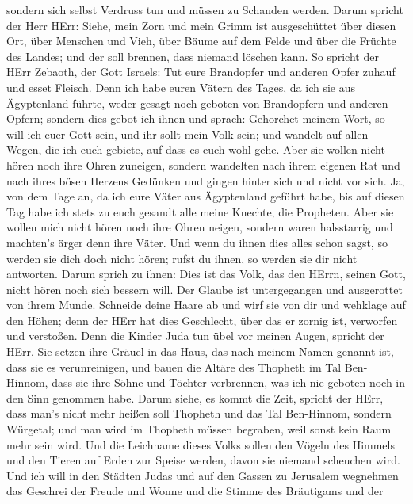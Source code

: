 sondern sich selbst Verdruss tun und müssen zu Schanden werden.
 Darum spricht der Herr HErr: Siehe, mein Zorn und mein
Grimm ist ausgeschüttet über diesen Ort, über Menschen und Vieh, über
Bäume auf dem Felde und über die Früchte des Landes; und der soll
brennen, dass niemand löschen kann.  So spricht der HErr
Zebaoth, der Gott Israels: Tut eure Brandopfer und anderen Opfer zuhauf
und esset Fleisch.  Denn ich habe euren Vätern des Tages,
da ich sie aus Ägyptenland führte, weder gesagt noch geboten von
Brandopfern und anderen Opfern;  sondern dies gebot ich
ihnen und sprach: Gehorchet meinem Wort, so will ich euer Gott sein, und
ihr sollt mein Volk sein; und wandelt auf allen Wegen, die ich euch
gebiete, auf dass es euch wohl gehe.  Aber sie wollen nicht
hören noch ihre Ohren zuneigen, sondern wandelten nach ihrem eigenen Rat
und nach ihres bösen Herzens Gedünken und gingen hinter sich und nicht
vor sich.  Ja, von dem Tage an, da ich eure Väter aus
Ägyptenland geführt habe, bis auf diesen Tag habe ich stets zu euch
gesandt alle meine Knechte, die Propheten.  Aber sie wollen
mich nicht hören noch ihre Ohren neigen, sondern waren halsstarrig und
machten's ärger denn ihre Väter.  Und wenn du ihnen dies
alles schon sagst, so werden sie dich doch nicht hören; rufst du ihnen,
so werden sie dir nicht antworten.  Darum sprich zu ihnen:
Dies ist das Volk, das den HErrn, seinen Gott, nicht hören noch sich
bessern will. Der Glaube ist untergegangen und ausgerottet von ihrem
Munde.  Schneide deine Haare ab und wirf sie von dir und
wehklage auf den Höhen; denn der HErr hat dies Geschlecht, über das er
zornig ist, verworfen und verstoßen.  Denn die Kinder Juda
tun übel vor meinen Augen, spricht der HErr. Sie setzen ihre Gräuel in
das Haus, das nach meinem Namen genannt ist, dass sie es verunreinigen,
 und bauen die Altäre des Thopheth im Tal Ben-Hinnom, dass
sie ihre Söhne und Töchter verbrennen, was ich nie geboten noch in den
Sinn genommen habe.  Darum siehe, es kommt die Zeit,
spricht der HErr, dass man's nicht mehr heißen soll Thopheth und das Tal
Ben-Hinnom, sondern Würgetal; und man wird im Thopheth müssen begraben,
weil sonst kein Raum mehr sein wird.  Und die Leichname
dieses Volks sollen den Vögeln des Himmels und den Tieren auf Erden zur
Speise werden, davon sie niemand scheuchen wird.  Und ich
will in den Städten Judas und auf den Gassen zu Jerusalem wegnehmen das
Geschrei der Freude und Wonne und die Stimme des Bräutigams und der
